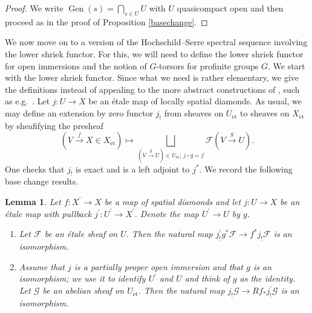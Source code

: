 \documentclass{amsart}
\newtheorem{lemma}[subsubsection]{Lemma}
\theoremstyle{remark}
\numberwithin{equation}{subsection}
\newcommand{\cF}{{\mathcal F}}
\newcommand{\cG}{{\mathcal G}}
\DeclareMathOperator{\Gen}{Gen}
\newcommand{\et}{\mathrm{\acute{e}t}}
\renewcommand{\(}{\left(}
\renewcommand{\)}{\right)}
\begin{document}
\begin{proof}
We write $\Gen(s)=\bigcap_{s\in U}U$ with $U$ quasicompact open and then proceed as in the proof of Proposition \ref{basechange}.
\end{proof}

We now move on to a version of the Hochschild--Serre spectral sequence involving the lower shriek functor. For this, we will need to define the lower shriek functor for open immersions and the notion of $G$-torsors for profinite groups $G$. We start with the lower shriek functor. Since what we need is rather elementary, we give the definitions instead of appealing to the more abstract constructions of \cite{diamonds}, such as e.g.\ \cite[Definition/Proposition 19.1]{diamonds}. Let $j \colon U \to X$ be an \'etale map of locally spatial diamonds. As usual, we may define an extension by zero functor $j_{!}$ from sheaves on $U_{\et}$ to sheaves on $X_{\et}$ by sheafifying the presheaf
$$ \left( V \overset{f}{\to} X \in X_{\et} \right) \mapsto \bigsqcup_{(V \overset{g}{\to} U) \in U_{\et};\,j\circ g=f}\cF(V \overset{g}{\to} U). $$
One checks that $j_{!}$ is exact and is a left adjoint to $j^{\ast}$. We record the following base change results.

\begin{lemma}\label{shriekbasechange}
Let $f \colon X^{\prime} \to X$ be a map of spatial diamonds and let $j \colon U \to X$ be an \'etale map with pullback $j^{\prime} \colon U^{\prime} \to X^{\prime}$. Denote the map $ U^{\prime} \to U$ by $g$.
\begin{enumerate}
\item Let $\cF$ be an \'etale sheaf on $U$. Then the natural map $j^{\prime}_{!}g^{\ast}\cF \to f^{\ast}j_{!}\cF $ is an isomorphism.

\item Assume that $j$ is a partially proper open immersion and that $g$ is an isomorphism; we use it to identify $U^{\prime}$ and $U$ and think of $g$ as the identity. Let $\cG$ be an abelian sheaf on $U_{\et}$. Then the natural map $j_{!}\cG \to Rf_{\ast}j_{!}^{\prime}\cG$ is an isomorphism.
\end{enumerate}
\end{lemma}
\end{document}
